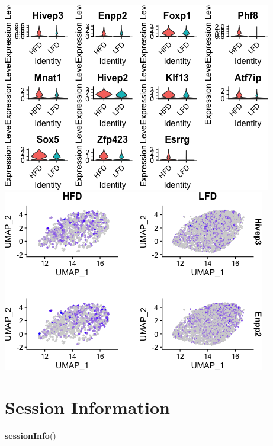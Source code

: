 \documentclass[]{article}
\newenvironment{Shaded}{\begin{snugshade}}{\end{snugshade}}
\newcommand{\KeywordTok}[1]{\textcolor[rgb]{0.13,0.29,0.53}{\textbf{#1}}}
\newcommand{\NormalTok}[1]{#1}
\begin{document}
\includegraphics{figures/GSE160729-de-by-hfd-1.png}
\includegraphics{figures/GSE160729-de-by-hfd-2.png}

\hypertarget{session-information}{%
\section{Session Information}\label{session-information}}

\begin{Shaded}
\begin{Highlighting}[]
\KeywordTok{sessionInfo}\NormalTok{()}
\end{Highlighting}
\end{Shaded}
\end{document}
